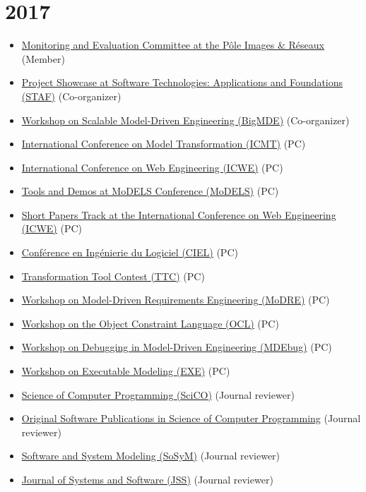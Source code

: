 \hypertarget{section-3}{%
\section{2017}\label{section-3}}

\begin{itemize}
\tightlist
\item
  \href{http://www.images-et-reseaux.com/en}{Monitoring and Evaluation
  Committee at the Pôle Images \& Réseaux} (Member)
\item
  \href{http://www.informatik.uni-marburg.de/staf2017/index.php/projects-showcases/}{Project
  Showcase at Software Technologies: Applications and Foundations
  (STAF)} (Co-organizer)
\item
  \href{http://www.big-mde.eu/}{Workshop on Scalable Model-Driven
  Engineering (BigMDE)} (Co-organizer)
\item
  \href{http://www.model-transformation.org/}{International Conference
  on Model Transformation (ICMT)} (PC)
\item
  \href{http://icwe2017.webengineering.org/}{International Conference on
  Web Engineering (ICWE)} (PC)
\item
  \href{http://www.cs.colostate.edu/~ghosh/models17_td/home_models17_td.html}{Tools
  and Demos at MoDELS Conference (MoDELS)} (PC)
\item
  \href{http://icwe2017.webengineering.org/}{Short Papers Track at the
  International Conference on Web Engineering (ICWE)} (PC)
\item
  \href{https://ciel2016.sciencesconf.org/}{Conférence en Ingénierie du
  Logiciel (CIEL)} (PC)
\item
  \href{http://www.transformation-tool-contest.eu/}{Transformation Tool
  Contest (TTC)} (PC)
\item
  \href{http://www.modre2017.ece.mcgill.ca/}{Workshop on Model-Driven
  Requirements Engineering (MoDRE)} (PC)
\item
  \href{http://oclworkshop.github.io/2017/}{Workshop on the Object
  Constraint Language (OCL)} (PC)
\item
  \href{https://msdl.uantwerpen.be/conferences/MDEbug/}{Workshop on
  Debugging in Model-Driven Engineering (MDEbug)} (PC)
\item
  \href{http://www.modelexecution.org/?page_id=1820}{Workshop on
  Executable Modeling (EXE)} (PC)
\item
  \href{http://www.journals.elsevier.com/science-of-computer-programming/}{Science
  of Computer Programming (SciCO)} (Journal reviewer)
\item
  \href{https://www.journals.elsevier.com/science-of-computer-programming/call-for-software/a-new-software-track-on-original-software-publications-scico/}{Original
  Software Publications in Science of Computer Programming} (Journal
  reviewer)
\item
  \href{http://www.sosym.org/}{Software and System Modeling (SoSyM)}
  (Journal reviewer)
\item
  \href{http://www.journals.elsevier.com/journal-of-systems-and-software}{Journal
  of Systems and Software (JSS)} (Journal reviewer)
\end{itemize}


